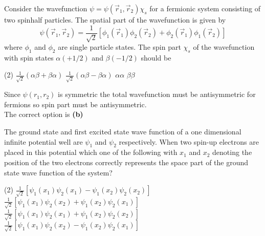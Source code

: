 \begin{enumerate}
\begin{minipage}{\textwidth}
	\item Consider the wavefunction $\psi=\psi\left(\vec{r}_{1}, \vec{r}_{2}\right) \chi_{s}$ for a fermionic system consisting of two spinhalf particles. The spatial part of the wavefunction is given by
	$$
	\psi\left(\vec{r}_{1}, \vec{r}_{2}\right)=\frac{1}{\sqrt{2}}\left[\phi_{1}\left(\vec{r}_{1}\right) \phi_{2}\left(\vec{r}_{2}\right)+\phi_{2}\left(\vec{r}_{1}\right) \phi_{1}\left(\vec{r}_{2}\right)\right]
	$$
	where $\phi_{1}$ and $\phi_{2}$ are single particle states. The spin part $\chi_{s}$ of the wavefunction with spin states $\alpha(+1 / 2)$ and $\beta(-1 / 2)$ should be
\end{minipage}
\begin{tasks}(2)
	\task[\textbf{A.}]$\frac{1}{\sqrt{2}}(\alpha \beta+\beta \alpha)$
	\task[\textbf{B.}]$\frac{1}{\sqrt{2}}(\alpha \beta-\beta \alpha)$
	\task[\textbf{C.}]$\alpha \alpha$
	\task[\textbf{D.}] $\beta \beta$
\end{tasks}
\begin{answer}
	Since $\psi\left(r_{1}, r_{2}\right)$ is symmetric the total wavefunction must be antisymmetric for fermions so spin part must be antisymmetric.\\
	The correct option is \textbf{(b)}
\end{answer}
\begin{minipage}{\textwidth}
	\item The ground state and first excited state wave function of a one dimensional infinite potential well are $\psi_{1}$ and $\psi_{2}$ respectively. When two spin-up electrons are placed in this potential which one of the following with $x_{1}$ and $x_{2}$ denoting the position of the two electrons correctly represents the space part of the ground state wave function of the system?
\end{minipage}
\begin{tasks}(2)
	\task[\textbf{A.}] $\frac{1}{\sqrt{2}}\left[\psi_{1}\left(x_{1}\right) \psi_{2}\left(x_{1}\right)-\psi_{1}\left(x_{2}\right) \psi_{2}\left(x_{2}\right)\right]$
	\task[\textbf{B.}]$\frac{1}{\sqrt{2}}\left[\psi_{1}\left(x_{1}\right) \psi_{2}\left(x_{2}\right)+\psi_{1}\left(x_{2}\right) \psi_{2}\left(x_{1}\right)\right]$
	\task[\textbf{C.}]$\frac{1}{\sqrt{2}}\left[\psi_{1}\left(x_{1}\right) \psi_{2}\left(x_{1}\right)+\psi_{1}\left(x_{2}\right) \psi_{2}\left(x_{2}\right)\right]$
	\task[\textbf{D.}]$ \frac{1}{\sqrt{2}}\left[\psi_{1}\left(x_{1}\right) \psi_{2}\left(x_{2}\right)-\psi_{1}\left(x_{2}\right) \psi_{2}\left(x_{1}\right)\right]$

\end{tasks}
\end{enumerate}
